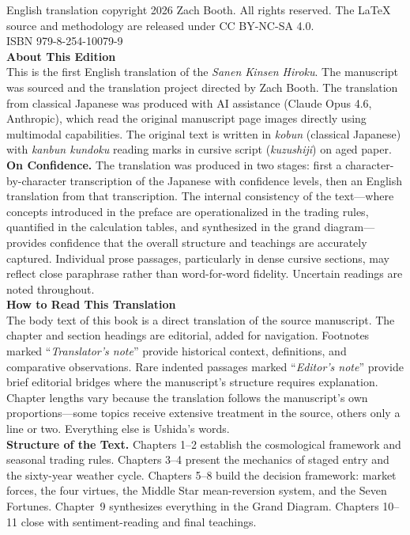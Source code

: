 \documentclass[10pt, openany]{book}
\begin{document}
\begin{small}
\noindent English translation copyright \textcopyright{} 2026 Zach Booth.
All rights reserved. The \LaTeX{} source and methodology are released
under CC BY-NC-SA 4.0.\\[0.5em]
ISBN 979-8-254-10079-9\\[1em]

\noindent\textbf{About This Edition}\\[0.3em]
\noindent This is the first English translation of the \textit{Sanen Kinsen
Hiroku}. The manuscript was sourced and the translation project directed
by Zach Booth. The translation from classical Japanese was produced with
AI assistance (Claude Opus 4.6, Anthropic), which read the original
manuscript page images directly using multimodal capabilities. The
original text is written in \textit{kobun} (classical Japanese) with
\textit{kanbun kundoku} reading marks in cursive script
(\textit{kuzushiji}) on aged paper.\\[0.5em]
\noindent\textbf{On Confidence.} The translation was produced in two
stages: first a character-by-character transcription of the Japanese
with confidence levels, then an English translation from that
transcription. The internal consistency of the text---where concepts
introduced in the preface are operationalized in the trading rules,
quantified in the calculation tables, and synthesized in the grand
diagram---provides confidence that the overall structure and teachings
are accurately captured. Individual prose passages, particularly in
dense cursive sections, may reflect close paraphrase rather than
word-for-word fidelity. Uncertain readings are noted throughout.\\[1em]

\noindent\textbf{How to Read This Translation}\\[0.3em]
\noindent The body text of this book is a direct translation of the source
manuscript. The chapter and section headings are editorial, added for
navigation. Footnotes marked ``\textit{Translator's note}'' provide
historical context, definitions, and comparative observations. Rare
indented passages marked ``\textit{Editor's note}'' provide brief
editorial bridges where the manuscript's structure requires explanation. Chapter lengths vary because
the translation follows the manuscript's own proportions---some topics
receive extensive treatment in the source, others only a line or two.
Everything else is Ushida's words.\\[0.5em]
\noindent\textbf{Structure of the Text.}
Chapters 1--2 establish the cosmological framework and seasonal trading
rules. Chapters 3--4 present the mechanics of staged entry and the
sixty-year weather cycle. Chapters 5--8 build the decision
framework: market forces, the four virtues, the Middle Star
mean-reversion system, and the Seven Fortunes. Chapter~9 synthesizes
everything in the Grand Diagram. Chapters 10--11 close with
sentiment-reading and final teachings.
\end{small}
\newpage
\end{document}
